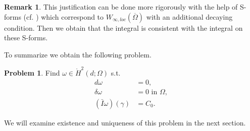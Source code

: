 \documentclass[12pt,a4paper]{article}
\theoremstyle{definition}
\newtheorem{remark}{Remark}
\newtheorem{problem}{Problem}
\newcommand{\omegabar}{\overline{\Omega}}
\newcommand{\real}{\mathbb{R}}
\begin{document}
\begin{remark}
    This justification can be done more rigorously with the help of S-forms
    (cf. \cite{goldshtein}) which correspond to $W_{\infty,loc}(\omegabar)$
    with an additional decaying condition. Then we obtain that the integral 
    is consistent with the integral on these S-forms.
\end{remark}
\noindent To summarize we obtain the following problem.

\begin{problem}
    Find $\omega \in \mathring{H}^2(d;\Omega)$ s.t.
    \begin{align*}
        d \omega &= 0, \\
        \delta \omega &= 0 \text{ in $\Omega$}, \\
        (\bar{I}\omega)(\gamma)  &= C_0.
    \end{align*}
\end{problem}
\noindent We will examine existence and 
uniqueness of this problem in the next section.


\end{document}
